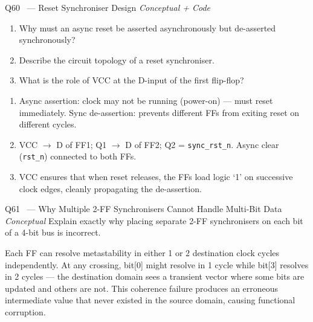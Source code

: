 \documentclass[12pt,a4paper]{article}
\newcommand{\moderate}{%
  \fbox{\textcolor{modoran}{\bfseries\sffamily\small MODERATE}}}
\begin{document}
\begin{questionbox}{Q60 \moderate\ --- Reset Synchroniser Design \hfill\textit{Conceptual + Code}}
\begin{enumerate}[label=\textbf{\alph*)}]
  \item Why must an async reset be asserted asynchronously but de-asserted synchronously?
  \item Describe the circuit topology of a reset synchroniser.
  \item What is the role of VCC at the D-input of the first flip-flop?
\end{enumerate}
\end{questionbox}

\begin{answerbox}
\begin{enumerate}[label=\textbf{\alph*)}]
  \item Async assertion: clock may not be running (power-on) --- must reset immediately. Sync de-assertion: prevents different FFs from exiting reset on different cycles.
  \item VCC $\to$ D of FF1; Q1 $\to$ D of FF2; Q2 = \texttt{sync\_rst\_n}. Async clear (\texttt{rst\_n}) connected to both FFs.
  \item VCC ensures that when reset releases, the FFs load logic `1' on successive clock edges, cleanly propagating the de-assertion.
\end{enumerate}
\end{answerbox}

\begin{questionbox}{Q61 \moderate\ --- Why Multiple 2-FF Synchronisers Cannot Handle Multi-Bit Data \hfill\textit{Conceptual}}
Explain exactly why placing separate 2-FF synchronisers on each bit of a 4-bit bus is incorrect.
\end{questionbox}

\begin{answerbox}
Each FF can resolve metastability in either 1 or 2 destination clock cycles independently. At any crossing, bit[0] might resolve in 1 cycle while bit[3] resolves in 2 cycles --- the destination domain sees a transient vector where some bits are updated and others are not. This coherence failure produces an erroneous intermediate value that never existed in the source domain, causing functional corruption.
\end{answerbox}
\end{document}

